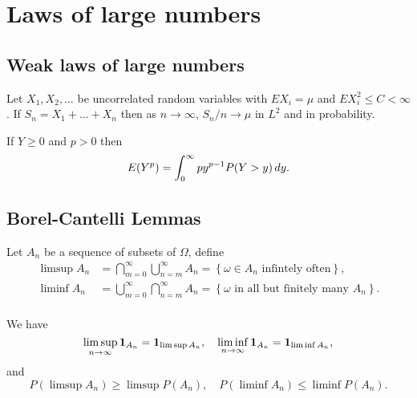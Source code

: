 \documentclass[a4paper]{article}
\begin{document}
\maketitle

\tableofcontents

\setcounter{section}{1}
\section{Laws of large numbers}

\setcounter{subsection}{1}

\subsection{Weak laws of large numbers}
\begin{thm}
Let $X_1, X_2, \dots$ be uncorrelated random variables with $EX_i = \mu$
and $E X_i^2 \leq C < \infty$. If $S_n = X_1 + \dots + X_n$ then 
as $n \to \infty$, $S_n / n \to \mu$ in $L^2$ and in probability.
\end{thm}


\begin{lemma}
  If $Y \geq 0$ and $p > 0$ then 
  \[
  E(Y^p) = \int_0^\infty p y^{p - 1} P(Y > y) \, d y.
  \]
\end{lemma}

\subsection{Borel-Cantelli Lemmas}

\begin{defi}
  Let $A_n$ be a sequence of subsets of $\Omega$, define 
  \[
  \begin{aligned}
    \limsup A_n 
    &= \bigcap_{m = 0}^\infty \bigcup_{n = m}^\infty A_n 
    = \left\{ \omega \in A_n \text{ infintely often} \right\}, \\
    \liminf A_n 
    &= \bigcup_{m = 0}^\infty \bigcap_{n = m}^\infty A_n 
    = \left\{ \text{$\omega$ in all but finitely many $A_n$} \right\}. \\
  \end{aligned}
  \]
\end{defi}

\begin{prop}
  We have 
  \[
  \limsup_{n \to \infty} \operatorname{\mathbf{1}}_{A_n} = \operatorname{\mathbf{1}}_{\limsup A_n}, \quad 
  \liminf_{n \to \infty} \operatorname{\mathbf{1}}_{A_n} = \operatorname{\mathbf{1}}_{\liminf A_n},
  \]
  and 
  \[
  P(\limsup A_n) \geq \limsup P(A_n), \quad 
  P(\liminf A_n) \leq \liminf P(A_n).
  \]
\end{prop}
\end{document}
